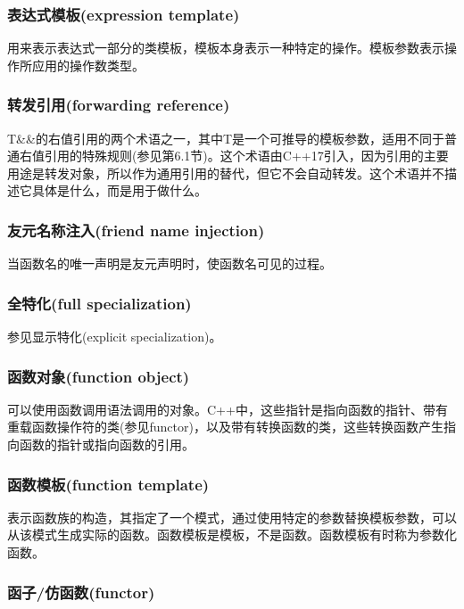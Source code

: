 \subsubsection{表达式模板(expression template)}

用来表示表达式一部分的类模板，模板本身表示一种特定的操作。模板参数表示操作所应用的操作数类型。

\subsubsection{转发引用(forwarding reference)}

T\&\&的右值引用的两个术语之一，其中T是一个可推导的模板参数，适用不同于普通右值引用的特殊规则(参见第6.1节)。这个术语由C++17引入，因为引用的主要用途是转发对象，所以作为通用引用的替代，但它不会自动转发。这个术语并不描述它具体是什么，而是用于做什么。

\subsubsection{友元名称注入(friend name injection)}

当函数名的唯一声明是友元声明时，使函数名可见的过程。

\subsubsection{全特化(full specialization)}

参见显示特化(explicit specialization)。

\subsubsection{函数对象(function object)}

可以使用函数调用语法调用的对象。C++中，这些指针是指向函数的指针、带有重载函数操作符的类(参见functor)，以及带有转换函数的类，这些转换函数产生指向函数的指针或指向函数的引用。

\subsubsection{函数模板(function template)}

表示函数族的构造，其指定了一个模式，通过使用特定的参数替换模板参数，可以从该模式生成实际的函数。函数模板是模板，不是函数。函数模板有时称为参数化函数。

\subsubsection{函子/仿函数(functor)}

